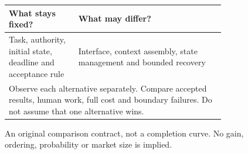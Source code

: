 \begin{figure}[htbp]
\centering\small
\begin{tabular}{|p{0.28\linewidth}|p{0.59\linewidth}|}
\hline
\textbf{What stays fixed?} & \textbf{What may differ?} \\
\hline
Task, authority, initial state, deadline and acceptance rule & Interface, context assembly, state management and bounded recovery \\
\hline
\multicolumn{2}{|p{0.91\linewidth}|}{Observe each alternative separately. Compare accepted results, human work, full cost and boundary failures. Do not assume that one alternative wins.} \\
\hline
\end{tabular}
\caption{An original comparison contract, not a completion curve. No gain, ordering, probability or market size is implied.}
\label{fig:comparison-contract}
\end{figure}
